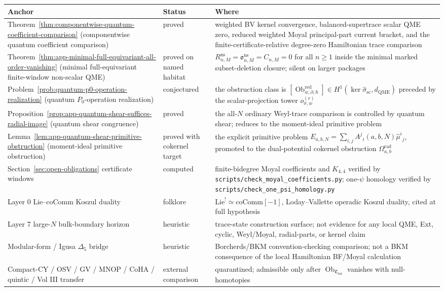 \begin{longtable}{@{}>{\raggedright\arraybackslash}p{}
  >{\raggedright\arraybackslash}p{}
  >{\raggedright\arraybackslash}p{}@{}}
\textbf{Anchor} & \textbf{Status} & \textbf{Where}\\
\hline
Theorem~\ref{thm:componentwise-quantum-coefficient-comparison}
(componentwise quantum coefficient comparison) & proved &
weighted BV kernel convergence, balanced-supertrace scalar QME zero,
reduced weighted Moyal principal-part current bracket, and the
finite-certificate-relative degree-zero Hamiltonian trace
comparison\\
Theorem~\ref{thm:app-minimal-full-equivariant-all-order-vanishing}
(minimal full-equivariant finite-window non-scalar QME) & proved on
named habitat &
\(R^{\mathrm{ns}}_{n,M}=\mathfrak o^{\mathrm{ns}}_{n,M}=C_{n,M}=0\)
for all \(n\geq1\) inside the minimal marked subset-deletion closure;
silent on larger packages\\
Problem~\ref{prob:quantum-p0-operation-realization}
(quantum \(P_0\)-operation realization) & conjectured &
the obstruction class is
\([\operatorname{Ob}^{\mathrm{red}}_{w,\partial,\hbar}]
\in H^1(\ker\widehat\sigma_{\mathrm{sc}},d_{\mathrm{QME}})\) preceded
by the scalar-projection tower \(o_{\sigma,w}^{(r)}\)\\
Proposition~\ref{prop:app-quantum-shear-suffices-radial-image}
(quantum shear congruence) & proved &
the all-\(N\) ordinary Weyl-trace comparison is controlled by quantum
shear; reduces to the moment-ideal primitive problem\\
Lemma~\ref{lem:app-quantum-shear-primitive-obstruction}
(moment-ideal primitive obstruction) & proved with cokernel target &
the explicit primitive problem
\(E_{a,b,N}=\sum_{i,j}A^j{}_i(a,b,N)\widehat\mu^i{}_j\), promoted to
the dual-potential cokernel obstruction
\(\Omega^{\mathrm{rad}}_{a,b}\)\\
Section~\ref{sec:open-obligations} certificate windows & computed &
finite-bidegree Moyal coefficients and \(K_{4,4}\) verified by
\texttt{scripts/check\_moyal\_coefficients.py}; one-\(\psi\) homology
verified by \texttt{scripts/check\_one\_psi\_homology.py}\\
Layer 0 Lie--coComm Koszul duality & folklore &
\(\mathrm{Lie}^{!}\simeq\mathrm{coComm}[-1]\), Loday--Vallette
operadic Koszul duality, cited at full hypothesis\\
Layer 7 large-\(N\) bulk-boundary horizon & heuristic &
trace-state construction surface; not evidence for any local QME, Ext,
cyclic, Weyl/Moyal, radial-parts, or kernel claim\\
Modular-form / Igusa \(\Delta_5\) bridge & heuristic &
Borcherds/BKM convention-checking comparison; not a BKM consequence of
the local Hamiltonian BF/Moyal calculation\\
Compact-CY / OSV / GV / MNOP / CoHA / quintic / Vol III transfer &
external comparison &
quarantined; admissible only after
\(\operatorname{Ob}_{\mathfrak C_{\mathrm{tar}}}\) vanishes with
null-homotopies\\
\end{longtable}

